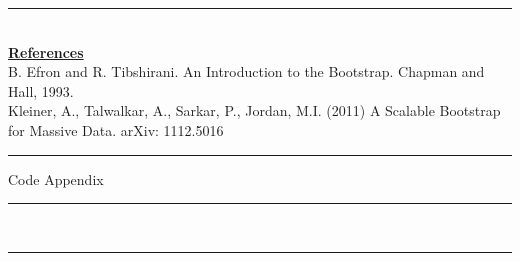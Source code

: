 \documentclass[a4paper, 11pt]{report}
\begin{document}
	
	\newpage
	
	\noindent\rule{\textwidth}{1pt} \\
	
	\textbf{\underline{References}} \\
	
	\noindent B. Efron and R. Tibshirani. An Introduction to the Bootstrap. Chapman and Hall, 1993. \\
	
	\noindent Kleiner, A., Talwalkar, A., Sarkar, P., Jordan, M.I. (2011) A Scalable Bootstrap for Massive Data. arXiv: 1112.5016 \\
	
	
	
	\newpage
	
	\noindent\rule{\textwidth}{1pt} 
	\begin{center} 
		Code Appendix
	\end{center}
	\vspace*{-7pt}
	\noindent\rule{\textwidth}{1pt} \\
	
	\noindent\rule{\textwidth}{1pt} \\
	
\end{document}
